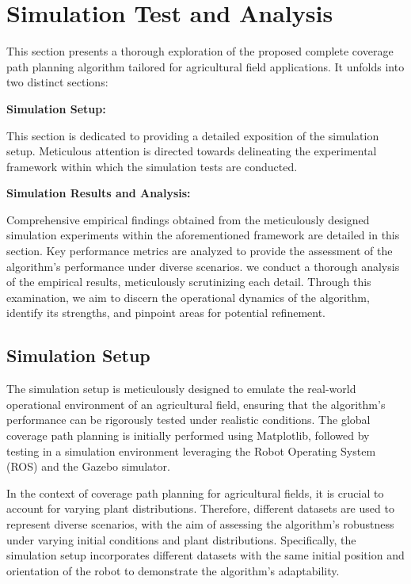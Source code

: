 
\chapter{Simulation Test and Analysis}


This section presents a thorough exploration of the proposed complete coverage path planning algorithm tailored for agricultural field applications. It unfolds into two distinct sections:

\vspace{3mm}  

\textbf{Simulation Setup:} 

This section is dedicated to providing a detailed exposition of the simulation setup. Meticulous attention is directed towards delineating the experimental framework within which the simulation tests are conducted.

\vspace{3mm}  

\textbf{Simulation Results and Analysis:}  

Comprehensive empirical findings obtained from the meticulously designed simulation experiments within the aforementioned framework are detailed in this section. Key performance metrics are analyzed to provide the assessment of the algorithm's performance under diverse scenarios. we conduct a thorough analysis of the empirical results, meticulously scrutinizing each detail. Through this examination, we aim to discern the operational dynamics of the algorithm, identify its strengths, and pinpoint areas for potential refinement.


\section{Simulation Setup}


The simulation setup is meticulously designed to emulate the real-world operational environment of an agricultural field, ensuring that the algorithm's performance can be rigorously tested under realistic conditions. The global coverage path planning is initially performed using Matplotlib, followed by testing in a simulation environment leveraging the Robot Operating System (ROS) and the Gazebo simulator.

\vspace{3mm}  

In the context of coverage path planning for agricultural fields, it is crucial to account for varying plant distributions. Therefore, different datasets are used to represent diverse scenarios, with the aim of assessing the algorithm's robustness under varying initial conditions and plant distributions. Specifically, the simulation setup incorporates different datasets with the same initial position and orientation of the robot to demonstrate the algorithm's adaptability.


